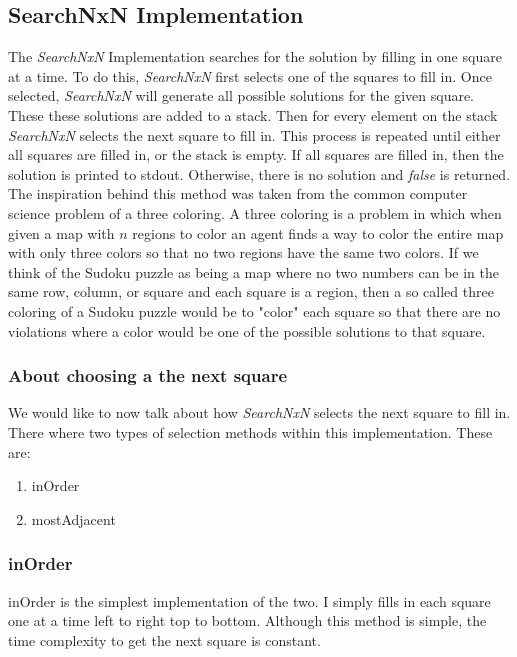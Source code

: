 \documentclass[letterpaper]{article}
\begin{document}
\subsection{SearchNxN Implementation}
The \emph{SearchNxN} Implementation searches for the solution by filling in one square at a time. To do this, \emph{SearchNxN} first selects one of the squares to fill in. Once selected, \emph{SearchNxN} will generate all possible solutions for the given square. These these solutions are added to a stack. Then for every element on the stack \emph{SearchNxN} selects the next square to fill in. This process is repeated until either all squares are filled in, or the stack is empty. If all squares are filled in, then the solution is printed to stdout. Otherwise, there is no solution and \emph{false} is returned. The inspiration behind this method was taken from the common computer science problem of a three coloring. A three coloring is a problem in which when given a map with $n$ regions to color an agent finds a way to color the entire map with only three colors so that no two regions have the same two colors. If we think of the Sudoku puzzle as being a map where no two numbers can be in the same row, column, or square and each square is a region, then a so called three coloring of a Sudoku puzzle would be to "color" each square so that there are no violations where a color would be one of the possible solutions to that square.

\subsubsection{About choosing a the next square}
We would like to now talk about how \emph{SearchNxN} selects the next square to fill in. There where two types of selection methods within this implementation. These are:
\begin{enumerate}
\item inOrder
\item mostAdjacent
\end{enumerate}

\subsubsection{inOrder}
inOrder is the simplest implementation of the two. I simply fills in each square one at a time left to right top to bottom. Although this method is simple, the time complexity to get the next square is constant.
\end{document}

